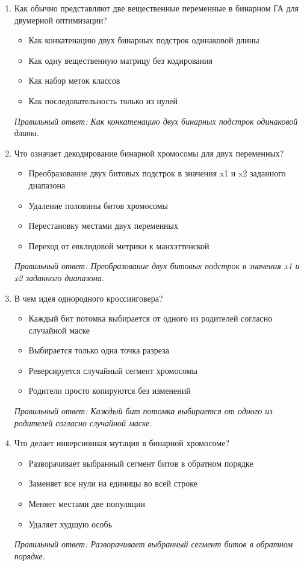 \small
\begin{enumerate}[label=\textbf{\arabic*.}, leftmargin=0pt, itemsep=1.2em]
\item Как обычно представляют две вещественные переменные в бинарном ГА для двумерной оптимизации?
\begin{itemize}[label=$\square$, leftmargin=1.5cm, itemsep=0.2em, topsep=0.3em]
\item Как конкатенацию двух бинарных подстрок одинаковой длины
\item Как одну вещественную матрицу без кодирования
\item Как набор меток классов
\item Как последовательность только из нулей
\end{itemize}
{\small\textit{Правильный ответ: Как конкатенацию двух бинарных подстрок одинаковой длины.}}

\item Что означает декодирование бинарной хромосомы для двух переменных?
\begin{itemize}[label=$\square$, leftmargin=1.5cm, itemsep=0.2em, topsep=0.3em]
\item Преобразование двух битовых подстрок в значения x1 и x2 заданного диапазона
\item Удаление половины битов хромосомы
\item Перестановку местами двух переменных
\item Переход от евклидовой метрики к манхэттенской
\end{itemize}
{\small\textit{Правильный ответ: Преобразование двух битовых подстрок в значения x1 и x2 заданного диапазона.}}

\item В чем идея однородного кроссинговера?
\begin{itemize}[label=$\square$, leftmargin=1.5cm, itemsep=0.2em, topsep=0.3em]
\item Каждый бит потомка выбирается от одного из родителей согласно случайной маске
\item Выбирается только одна точка разреза
\item Реверсируется случайный сегмент хромосомы
\item Родители просто копируются без изменений
\end{itemize}
{\small\textit{Правильный ответ: Каждый бит потомка выбирается от одного из родителей согласно случайной маске.}}

\item Что делает инверсионная мутация в бинарной хромосоме?
\begin{itemize}[label=$\square$, leftmargin=1.5cm, itemsep=0.2em, topsep=0.3em]
\item Разворачивает выбранный сегмент битов в обратном порядке
\item Заменяет все нули на единицы во всей строке
\item Меняет местами две популяции
\item Удаляет худшую особь
\end{itemize}
{\small\textit{Правильный ответ: Разворачивает выбранный сегмент битов в обратном порядке.}}


\end{enumerate}
